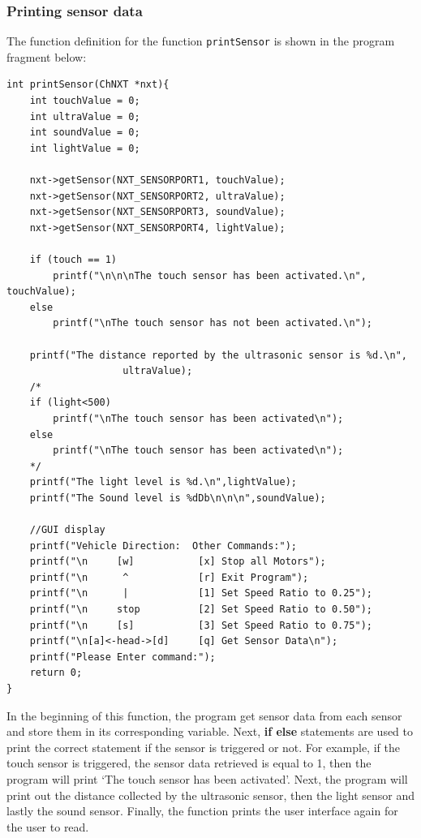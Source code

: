 \documentclass[11pt]{article}
\begin{document}
\subsubsection*{Printing sensor data}
The function definition for the function {\tt printSensor} is shown in the program 
fragment below:
\begin{lstlisting}
int printSensor(ChNXT *nxt){
    int touchValue = 0;
    int ultraValue = 0;
    int soundValue = 0;
    int lightValue = 0;

    nxt->getSensor(NXT_SENSORPORT1, touchValue);
    nxt->getSensor(NXT_SENSORPORT2, ultraValue);
    nxt->getSensor(NXT_SENSORPORT3, soundValue);
    nxt->getSensor(NXT_SENSORPORT4, lightValue);

    if (touch == 1)
        printf("\n\n\nThe touch sensor has been activated.\n", touchValue);
    else
        printf("\nThe touch sensor has not been activated.\n");

    printf("The distance reported by the ultrasonic sensor is %d.\n",
                    ultraValue);
    /*
    if (light<500)  
        printf("\nThe touch sensor has been activated\n");
    else    
        printf("\nThe touch sensor has been activated\n");
    */
    printf("The light level is %d.\n",lightValue);
    printf("The Sound level is %dDb\n\n\n",soundValue);
    
    //GUI display
    printf("Vehicle Direction:  Other Commands:");
    printf("\n     [w]           [x] Stop all Motors");
    printf("\n      ^            [r] Exit Program");
    printf("\n      |            [1] Set Speed Ratio to 0.25");
    printf("\n     stop          [2] Set Speed Ratio to 0.50");
    printf("\n     [s]           [3] Set Speed Ratio to 0.75");
    printf("\n[a]<-head->[d]     [q] Get Sensor Data\n");
    printf("Please Enter command:");
    return 0;
}
\end{lstlisting}
In the beginning of this function, the program get sensor data from each sensor 
and store them in its corresponding variable. Next, {\bf if else} statements 
are used to print the correct statement if the sensor is triggered or not. For 
example, if the touch sensor is triggered, the sensor data retrieved is equal to
1, then the program will print `The touch sensor has been activated'. Next, 
the program will print out the distance collected by the ultrasonic sensor, then 
the light sensor and lastly the sound sensor. Finally, the function prints the 
user interface again for the user to read.

\newpage
\appendix


\end{document}
